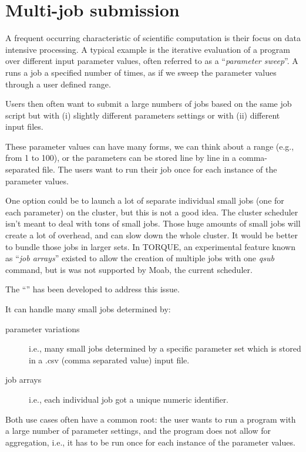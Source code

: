 \chapter{Multi-job submission}
\label{ch:multi-job-submission}

A frequent occurring characteristic of scientific computation is their focus on
data intensive processing. A typical example is the iterative evaluation of a
program over different input parameter values, often referred to as a
``\emph{parameter sweep}''.  A  runs a job a
specified number of times, as if we sweep the parameter values through a user
defined range.

Users then often want to submit a large numbers of jobs based on the same job
script but with (i) slightly different parameters settings or with (ii)
different input files.

These parameter values can have many forms, we can think about a range (e.g.,
from 1 to 100), or the parameters can be stored line by line in a
comma-separated file. The users want to run their job once for each instance of
the parameter values.

One option could be to launch a lot of separate individual small jobs (one for
each parameter) on the cluster, but this is not a good idea. The cluster
scheduler isn't meant to deal with tons of small jobs. Those huge amounts of
small jobs will create a lot of overhead, and can slow down the whole cluster.
It would be better to bundle those jobs in larger sets.  In TORQUE, an
experimental feature known as ``\emph{job arrays}'' existed to allow the
creation of multiple jobs with one \emph{qsub} command, but is was not
supported by Moab, the current scheduler.

The ``'' has been developed to address this issue.

It can handle many small jobs determined by:

\begin{description}
  \item[parameter variations] i.e., many small jobs determined by a specific parameter set which is stored in a .csv (comma separated value) input file.
  \item[job arrays] i.e., each individual job got a unique numeric identifier.
\end{description}

Both use cases often have a common root: the user wants to run a program with a
large number of parameter settings, and the program does not allow for
aggregation, i.e., it has to be run once for each instance of the parameter
values.

